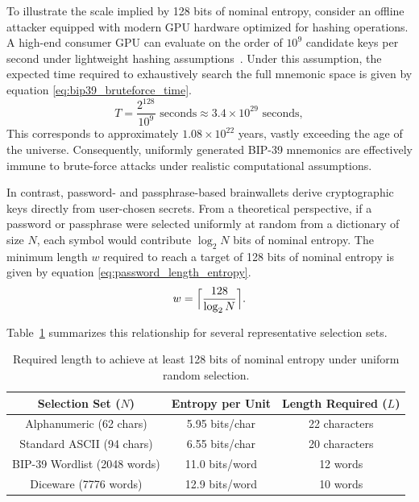 \documentclass[journal,article,submit,pdftex,moreauthors]{Definitions/mdpi}
\begin{document}
To illustrate the scale implied by 128 bits of nominal entropy, consider an offline attacker equipped with modern GPU hardware optimized for hashing operations. A high-end consumer GPU can evaluate on the order of $10^{9}$ candidate keys per second under lightweight hashing assumptions~\cite{Choi2024,Qiu2016,Durmuth2015}. Under this assumption, the expected time required to exhaustively search the full mnemonic space is given by equation \ref{eq:bip39_bruteforce_time}.
\begin{equation}
T = \frac{2^{128}}{10^{9}} \text{ seconds} \approx 3.4 \times 10^{29} \text{ seconds},
\label{eq:bip39_bruteforce_time}
\end{equation}
This corresponds to approximately $1.08 \times 10^{22}$ years, vastly exceeding the age of the universe. Consequently, uniformly generated BIP-39 mnemonics are effectively immune to brute-force attacks under realistic computational assumptions.


In contrast, password- and passphrase-based brainwallets derive cryptographic keys directly from user-chosen secrets. From a theoretical perspective, if a password or passphrase were selected uniformly at random from a dictionary of size $N$, each symbol would contribute $\log_2 N$ bits of nominal entropy. The minimum length $w$ required to reach a target of 128 bits of nominal entropy is given by equation \ref{eq:password_length_entropy}.
\begin{equation}
w = \Bigl\lceil \frac{128}{\log_2 N} \Bigr\rceil .
\label{eq:password_length_entropy}
\end{equation}


Table~\ref{tab:words_for_entropy} summarizes this relationship for several representative selection sets.

\begin{table}[H]
\caption{Required length to achieve at least 128 bits of nominal entropy under uniform random selection.}
\label{tab:words_for_entropy}
\centering
\begin{tabular}{ccc}
\toprule
\textbf{Selection Set ($N$)} & \textbf{Entropy per Unit} & \textbf{Length Required ($L$)} \\
\midrule
Alphanumeric (62 chars)      & 5.95 bits/char           & 22 characters                  \\
Standard ASCII (94 chars)    & 6.55 bits/char           & 20 characters                  \\
BIP-39 Wordlist (2048 words) & 11.0 bits/word           & 12 words                       \\
Diceware (7776 words)        & 12.9 bits/word           & 10 words                       \\
\bottomrule
\end{tabular}
\end{table}
\end{document}
